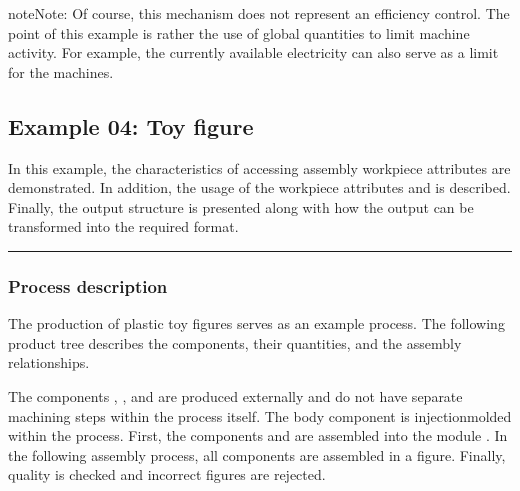 \documentclass[letterpaper,10pt,english]{sphinxmanual}
\begin{document}

\begin{sphinxadmonition}{note}{Note:}
\sphinxAtStartPar
Of course, this mechanism does not represent an efficiency control. The point of this example is rather the use of
global quantities to limit machine activity. For example, the currently available electricity can also serve as a
limit for the machines.
\end{sphinxadmonition}


\subsection{Example 04: Toy figure}
\label{\detokenize{source/Examples/example04:example-04-toy-figure}}\label{\detokenize{source/Examples/example04:id1}}\label{\detokenize{source/Examples/example04::doc}}
\sphinxAtStartPar
In this example, the characteristics of accessing assembly workpiece attributes are demonstrated. In addition, the usage
of the workpiece attributes  and  is described. Finally, the output structure is presented along with how
the output can be transformed into the required format.


\bigskip\hrule\bigskip



\subsubsection{Process description}
\label{\detokenize{source/Examples/example04:process-description}}\label{\detokenize{source/Examples/example04:process-description2}}
\sphinxAtStartPar
The production of plastic toy figures serves as an example process. The following product tree describes the components,
their quantities, and the assembly relationships.


\sphinxAtStartPar
The components , ,  and  are produced externally and do not have separate machining steps within
the process itself. The body component is injection\sphinxhyphen{}molded within the process. First, the components  and 
are assembled into the module . In the following assembly process, all components are assembled in a figure.
Finally, quality is checked and incorrect figures are rejected.
\end{document}
